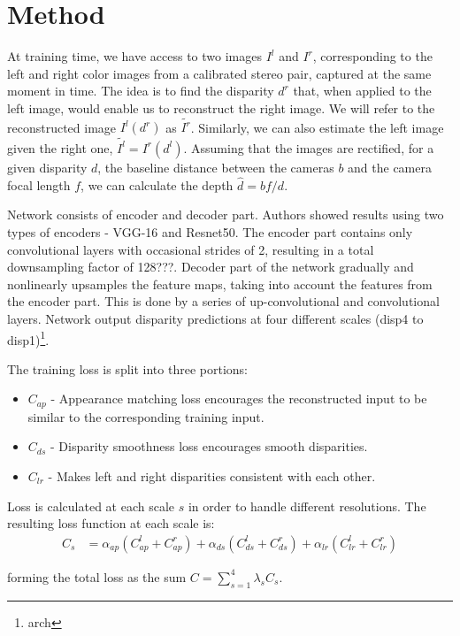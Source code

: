 \documentclass{article}
\begin{document}
\section{Method}
At training time, we have access to two images $I^l$ and $I^r$, corresponding to the left and right color images from a calibrated stereo pair, captured at the same moment in time. The idea is to find the disparity $d^r$ that, when applied to the left image, would enable us to reconstruct the right image. We will refer to the reconstructed image $I^l(d^r)$ as $\tilde{I^r}$. Similarly, we can also estimate the left image given the right one, $\tilde{I^l} = I^r(d^l)$. Assuming that the images are rectified\cite{nesto}, for a given disparity $d$, the baseline distance between the cameras $b$ and the camera focal length $f$, we can calculate the depth $\hat{d}=bf/d$.

Network consists of encoder and decoder part. Authors showed results using two types of encoders - VGG-16\cite{vgg} and Resnet50\cite{resnet}. The encoder part contains only convolutional layers with occasional strides of 2, resulting in a total downsampling factor of 128???. Decoder part of the network gradually and nonlinearly upsamples the feature maps, taking into account the features from the encoder part. This is done by a series of up-convolutional and convolutional layers. Network output disparity predictions at four different scales (disp4 to disp1)\footnote{arch}.

The training loss is split into three portions:
\begin{itemize}
	\item $C_{ap}$ - Appearance matching loss encourages the reconstructed input to be similar to the corresponding training input.
	\item $C_{ds}$ - Disparity smoothness loss encourages smooth disparities.
	\item $C_{lr}$ - Makes left and right disparities consistent with each other.
\end{itemize}

Loss is calculated at each scale $s$ in order to handle different resolutions. The resulting loss function at each scale is:
\begin{align*}
	C_s &= \alpha_{ap}(C_{ap}^{l} + C_{ap}^{r}) + \alpha_{ds}(C_{ds}^{l} + C_{ds}^{r}) +
\alpha_{lr}(C_{lr}^{l} + C_{lr}^{r})
\end{align*}

forming the total loss as the sum  $C = \sum_{s=1}^{4}\lambda_sC_s$.
\end{document}
